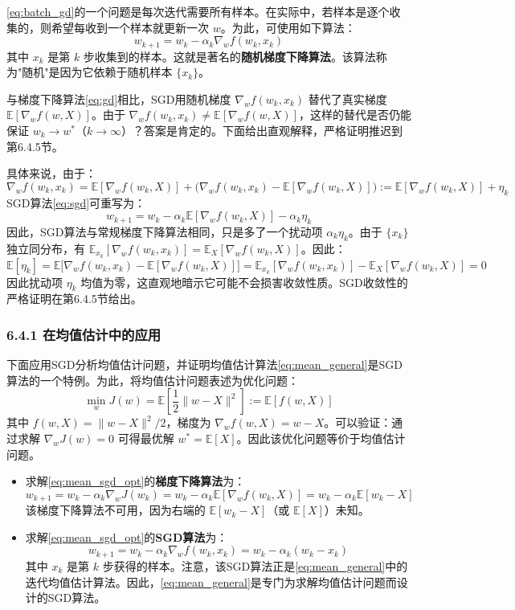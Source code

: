 \documentclass[UTF8]{article}
\begin{document}
\eqref{eq:batch_gd}的一个问题是每次迭代需要所有样本。在实际中，若样本是逐个收集的，则希望每收到一个样本就更新一次 $w$。为此，可使用如下算法：
\begin{equation}
\label{eq:sgd}
w_{k+1} = w_k - \alpha_k \nabla_w f(w_k, x_k)
\end{equation}
其中 $x_k$ 是第 $k$ 步收集到的样本。这就是著名的\textbf{随机梯度下降算法}。该算法称为"随机"是因为它依赖于随机样本 $\{x_k\}$。

与梯度下降算法\eqref{eq:gd}相比，SGD用随机梯度 $\nabla_w f(w_k, x_k)$ 替代了真实梯度 $\mathbb{E}[\nabla_w f(w, X)]$。由于 $\nabla_w f(w_k, x_k) \neq \mathbb{E}[\nabla_w f(w, X)]$，这样的替代是否仍能保证 $w_k \to w^*$（$k \to \infty$）？答案是肯定的。下面给出直观解释，严格证明推迟到第6.4.5节。

具体来说，由于：
\[
\nabla_w f(w_k, x_k) = \mathbb{E}[\nabla_w f(w_k, X)] + \big(\nabla_w f(w_k, x_k) - \mathbb{E}[\nabla_w f(w_k, X)]\big) := \mathbb{E}[\nabla_w f(w_k, X)] + \eta_k
\]
SGD算法\eqref{eq:sgd}可重写为：
\[
w_{k+1} = w_k - \alpha_k \mathbb{E}[\nabla_w f(w_k, X)] - \alpha_k \eta_k
\]
因此，SGD算法与常规梯度下降算法相同，只是多了一个扰动项 $\alpha_k \eta_k$。由于 $\{x_k\}$ 独立同分布，有 $\mathbb{E}_{x_k}[\nabla_w f(w_k, x_k)] = \mathbb{E}_X[\nabla_w f(w_k, X)]$。因此：
\[
\mathbb{E}[\eta_k] = \mathbb{E}\big[\nabla_w f(w_k, x_k) - \mathbb{E}[\nabla_w f(w_k, X)]\big] = \mathbb{E}_{x_k}[\nabla_w f(w_k, x_k)] - \mathbb{E}_X[\nabla_w f(w_k, X)] = 0
\]
因此扰动项 $\eta_k$ 均值为零，这直观地暗示它可能不会损害收敛性质。SGD收敛性的严格证明在第6.4.5节给出。

\subsubsection*{6.4.1 在均值估计中的应用}

下面应用SGD分析均值估计问题，并证明均值估计算法\eqref{eq:mean_general}是SGD算法的一个特例。为此，将均值估计问题表述为优化问题：
\begin{equation}
\label{eq:mean_sgd_opt}
\min_w J(w) = \mathbb{E}\left[\frac{1}{2}\|w - X\|^2\right] := \mathbb{E}[f(w, X)]
\end{equation}
其中 $f(w, X) = \|w - X\|^2/2$，梯度为 $\nabla_w f(w, X) = w - X$。可以验证：通过求解 $\nabla_w J(w) = 0$ 可得最优解 $w^* = \mathbb{E}[X]$。因此该优化问题等价于均值估计问题。

\begin{itemize}
    \item 求解\eqref{eq:mean_sgd_opt}的\textbf{梯度下降算法}为：
    \[
    w_{k+1} = w_k - \alpha_k \nabla_w J(w_k) = w_k - \alpha_k \mathbb{E}[\nabla_w f(w_k, X)] = w_k - \alpha_k \mathbb{E}[w_k - X]
    \]
    该梯度下降算法不可用，因为右端的 $\mathbb{E}[w_k - X]$（或 $\mathbb{E}[X]$）未知。

    \item 求解\eqref{eq:mean_sgd_opt}的\textbf{SGD算法}为：
    \[
    w_{k+1} = w_k - \alpha_k \nabla_w f(w_k, x_k) = w_k - \alpha_k(w_k - x_k)
    \]
    其中 $x_k$ 是第 $k$ 步获得的样本。注意，该SGD算法正是\eqref{eq:mean_general}中的迭代均值估计算法。因此，\eqref{eq:mean_general}是专门为求解均值估计问题而设计的SGD算法。
\end{itemize}
\end{document}

